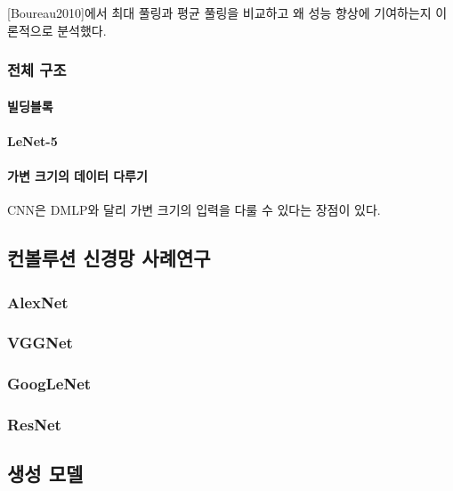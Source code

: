 \documentclass [12pt] {oblivoir}
\let\oldsubsubsection=\subsubsection
\renewcommand{\subsubsection}
{
  \filbreak
  \oldsubsubsection
}
\begin{document}
[Boureau2010]에서 최대 풀링과 평균 풀링을 비교하고 왜 성능 향상에 기여하는지 이론적으로 분석했다.

\subsubsection{전체 구조}

\paragraph*{빌딩블록}\mbox{}

\vspace{3mm}

\paragraph*{LeNet-5}\mbox{}

\vspace{3mm}

\paragraph*{가변 크기의 데이터 다루기}\mbox{}

CNN은 DMLP와 달리 가변 크기의 입력을 다룰 수 있다는 장점이 있다.

\vspace{3mm}

\subsection{컨볼루션 신경망 사례연구}

\subsubsection{AlexNet}

\subsubsection{VGGNet}

\subsubsection{GoogLeNet}

\subsubsection{ResNet}

\subsection{생성 모델}
\end{document}
